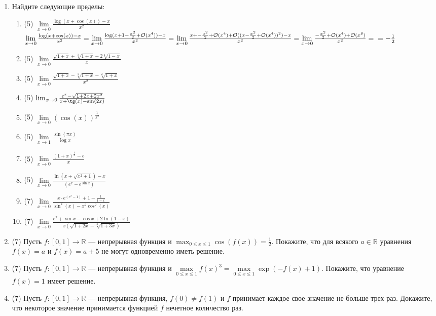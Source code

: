 \documentclass[a4paper]{article}
\begin{document}
\begin{enumerate}
    \item Найдите следующие пределы:
    \begin{enumerate}
        \item (5) $\lim\limits_{x\to 0}\frac{\log(x+\cos(x)) - x}{x^2}$\\
        $\lim\limits_{x\to 0}\frac{\log(x+\cos(x)) - x}{x^2} = \lim\limits_{x\to 0}\frac{\log(x + 1 - \frac{x^2}{2} + \mathcal O(x^4)) - x}{x^2} = 
        \lim\limits_{x\to 0}\frac{x + - \frac{x^2}{2} + \mathcal O(x^4) + \mathcal O((x - \frac{x^2}{2} + \mathcal O(x^4))^2) - x}{x^2} = \lim\limits_{x\to 0}\frac{- \frac{x^2}{2} + \mathcal O(x^4) + \mathcal O(x^8)}{x^2} =\\=-\frac{1}{2}$
        \item (5) $\lim\limits_{x\to 0}\frac{\sqrt{1+x} + \sqrt[3]{1+x} - 2\sqrt[4]{1-x}}{x}$
        \item (5) $\lim\limits_{x\to 0}\frac{\sqrt{1+x} - \sqrt[3]{1+x} - \sqrt[6]{1+x}}{x^2}$
        \item (5) $\lim_{x\to 0}\frac{e^x - \sqrt{1 + 2x + 2x^2}}{x + \tg(x) - \sin (2x)}$
        \item (5) $\lim\limits_{x\to 0}(\cos(x))^{\frac{1}{x^2}}$
        \item (5) $\lim\limits_{x\to 1}\frac{\sin(\pi x)}{\log x}$
        \item (5) $\lim\limits_{x\to 0}\frac{(1 + x)^{\frac{1}{x}} - e}{x}$
        \item (5) $\lim\limits_{x\to 0}\frac{\ln (x+\sqrt{x^2+1})-x}{(e^x-e^{\sin x})}$
        \item (7) $\lim\limits_{x\to 0}\frac{x\cdot e^{(e^x-1)}+1-\frac{1}{1-x}}{\sin^2(x)-x^2\cos^2(x)}$
        \item (7) $\lim\limits_{x\to 0} \frac{e^x+\sin x - \cos x + 2\ln(1-x)}{x(\sqrt{1+2x}-\sqrt[3]{1+3x})}$
    \end{enumerate}
    
    \item (7) Пусть $f:[0,1]\to \mathbb R$ --- непрерывная функция и $\max_{0\leq x\leq 1}\cos (f(x))=\frac{1}{2}$. Покажите, что для всякого $a\in \mathbb R$ уравнения $f(x) = a$ и $f(x) = a + 5$ не могут одновременно иметь решение.

\item (7) Пусть $f:[0,1]\to \mathbb R$ --- непрерывная функция и $\max\limits_{0\leq x\leq 1}f(x)^3 = \max\limits_{0\leq x\leq 1}\exp(-f(x) + 1)$. Покажите, что уравнение $f(x) = 1$ имеет решение.

\item (7) Пусть  $f:[0,1]\to \mathbb R$ --- непрерывная функция, $f(0)\neq f(1)$ и $f$ принимает каждое свое значение не больше трех раз. Докажите, что некоторое значение принимается функцией $f$ нечетное количество раз.
    
    
    
\end{enumerate}
\end{document}
